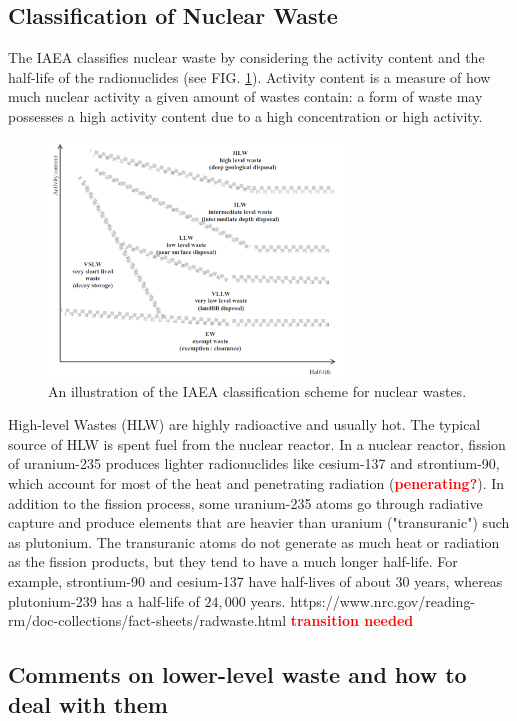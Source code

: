 \documentclass[preprint,aip,pra]{revtex4-1}
\newcommand{\red}[1]{\textcolor{red}{\bf #1}}
\begin{document}
    \subsection{Classification of Nuclear Waste}
    The IAEA classifies nuclear waste by considering the activity content and the half-life
    of the radionuclides (see FIG. \ref{fig:scheme}). Activity content is a measure of how much nuclear activity
    a given amount of wastes contain: a form of waste may possesses a high activity content due to
    a high concentration or high activity.\cite{iaea09}
    \begin{figure}[h]
        \centering
        \includegraphics[width=0.7\textwidth]{wastescheme.png}
        \caption{An illustration of the IAEA classification scheme for nuclear wastes.\cite{iaea09}}
        \label{fig:scheme}
    \end{figure}

    High-level Wastes (HLW) are highly radioactive and usually
    hot. The typical source of HLW is spent fuel from the nuclear reactor. In a nuclear reactor,
    fission of uranium-235 produces lighter radionuclides like cesium-137 and strontium-90, which
    account for most of the heat and penetrating radiation (\red{penerating?}). In addition to
    the fission process, some uranium-235 atoms go through radiative capture and produce elements that are
    heavier than uranium ("transuranic") such as plutonium. The transuranic atoms do not generate
    as much heat or radiation as the fission products, but they tend to have a much longer half-life.
    For example, strontium-90 and cesium-137 have half-lives of about $30$ years, whereas
    plutonium-239 has a half-life of $24,000$ years. https://www.nrc.gov/reading-rm/doc-collections/fact-sheets/radwaste.html
    \red{transition needed}

    \subsection{Comments on lower-level waste and how to deal with them}
\end{document}
